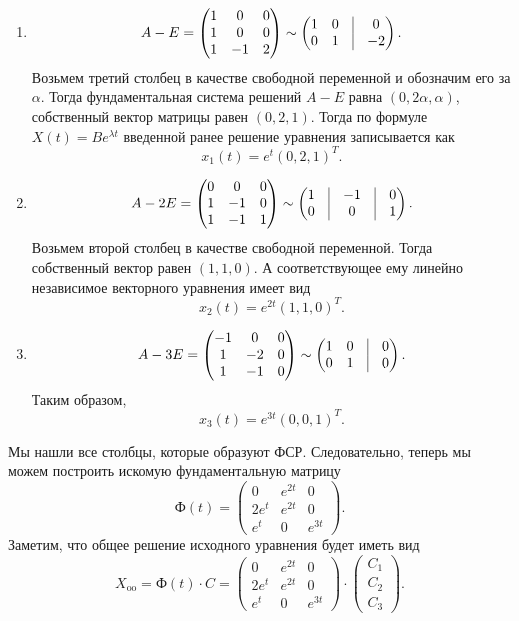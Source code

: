 \documentclass[a4paper, 12pt]{article}
\newcommand{\FI}{\text{Ф}}
\begin{document}
\begin{enumerate}
	\item $$A - E = \begin{pmatrix}
		1 & 0 & 0\\
		1 & 0 & 0\\
		1 & -1 & 2
	\end{pmatrix}\sim \begin{pmatrix}
	1 & 0 & \vline & 0\\
	0 & 1 & \vline & -2
\end{pmatrix}.$$ Возьмем третий столбец в качестве свободной переменной и обозначим его за $\alpha$. Тогда фундаментальная система решений $A - E$ равна $(0, 2\alpha, \alpha)$, собственный вектор матрицы равен $(0,2,1)$. Тогда по формуле $X(t) = Be^{\lambda t}$ введенной ранее решение уравнения записывается как $$x_1(t) = e^t(0,2,1)^T.$$
\item $$A - 2E = \begin{pmatrix}
	0 & 0 & 0\\
	1 & -1 & 0\\
	1 & -1 & 1
\end{pmatrix}\sim \begin{pmatrix}
1 & \vline & -1 & \vline & 0\\
0 & \vline & 0 & \vline & 1\\
\end{pmatrix}.$$ Возьмем второй столбец в качестве свободной переменной. Тогда собственный вектор равен $(1,1,0)$. А соответствующее ему линейно независимое векторного уравнения имеет вид
$$x_2(t) = e^{2t}(1,1,0)^T.$$
\item $$A - 3E = \begin{pmatrix}
	-1 & 0 & 0\\
	1 & -2 & 0\\
	1 & -1 & 0
\end{pmatrix} \sim \begin{pmatrix}
1 & 0 & \vline & 0\\
0 & 1 & \vline & 0
\end{pmatrix}.$$ Таким образом, $$x_3(t) = e^{3t}(0,0,1)^T.$$
\end{enumerate}
Мы нашли все столбцы, которые образуют ФСР. Следовательно, теперь мы можем построить искомую фундаментальную матрицу 
$$\FI(t) = \begin{pmatrix}
	0 & e^{2t} & 0\\
	2e^t & e^{2t} & 0\\
	e^t & 0 & e^{3t}
\end{pmatrix}.$$ 
Заметим, что общее решение исходного уравнения будет иметь вид $$X_\text{oo} = \FI(t)\cdot C =  \begin{pmatrix}
	0 & e^{2t} & 0\\
	2e^t & e^{2t} & 0\\
	e^t & 0 & e^{3t}
\end{pmatrix} \cdot \begin{pmatrix}
C_1 \\ C_2\\ C_3
\end{pmatrix}.$$
\end{document}
